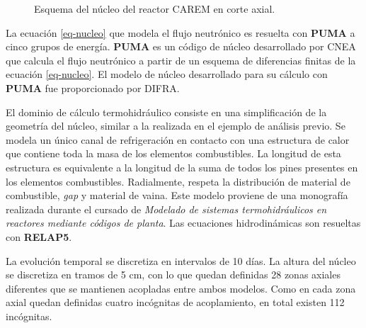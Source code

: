 \begin{figure}

\caption[Esquema del núcleo del reactor CAREM en corte axial]
{Esquema del núcleo del reactor CAREM en corte axial.}
\label{carem}
\end{figure}
La ecuación \ref{eq-nucleo} que modela el flujo neutrónico es resuelta con \textbf{PUMA} \cite{puma} a cinco grupos de energía.
\textbf{PUMA} es un código de núcleo desarrollado por CNEA que calcula el flujo neutrónico a partir de un esquema de diferencias finitas de la ecuación \ref{eq-nucleo}.
El modelo de núcleo desarrollado para su cálculo con \textbf{PUMA} fue proporcionado por DIFRA.

El dominio de cálculo termohidráulico consiste en una simplificación de la geometría del núcleo, similar a la realizada en el ejemplo de análisis previo.
Se modela un único canal de refrigeración en contacto con una estructura de calor que contiene toda la masa de los elementos combustibles.
La longitud de esta estructura es equivalente a la longitud de la suma de todos los pines presentes en los elementos combustibles.
Radialmente, respeta la distribución de material de combustible, \textit{gap} y material de vaina.
Este modelo proviene de una monografía \cite{relap-carem} realizada durante el cursado de \textit{Modelado de sistemas termohidráulicos en reactores mediante códigos de planta}.
Las ecuaciones hidrodinámicas son resueltas con \textbf{RELAP5}.

La evolución temporal se discretiza en intervalos de 10 días.
La altura del núcleo se discretiza en tramos de 5 cm, con lo que quedan definidas 28 zonas axiales diferentes que se mantienen acopladas entre ambos modelos.
Como en cada zona axial quedan definidas cuatro incógnitas de acoplamiento, en total existen 112 incógnitas.

